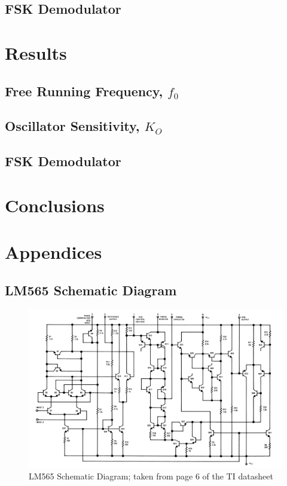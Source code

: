 \documentclass[titlepage, letterpaper, 10.5pt]{article}
\begin{document}
\subsection{FSK Demodulator}

\section{Results}

\subsection{Free Running Frequency, $f_{0}$}

\subsection{Oscillator Sensitivity, $K_{O}$}

\subsection{FSK Demodulator}

\section{Conclusions}

\section{Appendices}

\clearpage
\subsection{LM565 Schematic Diagram}
\label{lm565-schematic-diagram}

\begin{figure}[ht]
	\centering
	\includegraphics[width=1\textwidth]{diagrams/lm565-equivalent-circuit}
	\caption{LM565 Schematic Diagram; taken from page 6 of the TI datasheet}
	\label{lm565-equivalent-circuit}
\end{figure}
\end{document}
